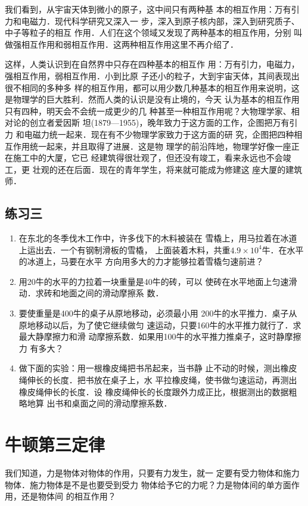     我们看到，从宇宙天体到微小的原子，这中间只有两种基
本的相互作用：万有引力和电磁力．现代科学研究又深入一
步，深入到原子核内部，深入到研究质子、中子等粒子的相互
作用．人们在这个领域又发现了两种基本的相互作用，分别
叫做强相互作用和弱相互作用．这两种相互作用这里不再介绍了．

    这样，人类认识到在自然界中只存在四种基本的相互作
用：万有引力，电磁力，强相互作用，弱相互作用．小到比原
子还小的粒子，大到宇宙天体，其间表现出很不相同的多种多
样的相互作用，都可以用少数几种基本的相互作用来说明，这
是物理学的巨大胜利．然而人类的认识是没有止境的，今天
认为基本的相互作用只有四种，明天会不会统一成更少的几
种甚至一种相互作用呢？大物理学家、相对论的创立者爱因斯
坦(1879—1955)，晚年致力于这方面的工作，企图把万有引力
和电磁力统一起来．现在有不少物理学家致力于这方面的研
究，企图把四种相互作用统一起来，并且取得了进展．这是物
理学的前沿阵地，物理学好像一座正在施工中的大厦，它已
经建筑得很壮观了，但还没有竣工，看来永远也不会竣工，更
壮观的还在后面．现在的青年学生，将来就可能成为修建这
座大厦的建筑师．

\subsection*{练习三} 
\begin{enumerate} 
\item  在东北的冬季伐木工作中，许多伐下的木料被装在
雪橇上，用马拉着在冰道上运出去．一个有钢制滑板的雪橇，
上面装着木料，共重$4.9\times 10^4$牛．在水平的冰道上，马要在水平
方向用多大的力才能够拉着雪橇匀速前进？

\item  用20牛的水平的力拉着一块重量是40牛的砖，可以
使砖在水平地面上匀速滑动．求砖和地面之间的滑动摩擦系
数．
\item  要使重量是400牛的桌子从原地移动，必须最小用
200牛的水平推力．桌子从原地移动以后，为了使它继续做匀
速运动，只要160牛的水平推力就行了．求最大静摩擦力和滑
动摩擦系数．如果用100牛的水平推力推桌子，这时静摩擦力
有多大？

\item  做下面的实验：用一根橡皮绳把书吊起来，当书静
止不动的时候，测出橡皮绳伸长的长度．把书放在桌子上，水
平拉橡皮绳，使书做匀速运动，再测出橡皮绳伸长的长度．设
橡皮绳伸长的长度跟外力成正比，根据测出的数据粗略地算
出书和桌面之间的滑动摩擦系数．
\end{enumerate} 


\section{牛顿第三定律} 
我们知道，力是物体对物体的作用，只要有力发生，就一
定要有受力物体和施力物体．施力物体是不是也要受到受力
物体给予它的力呢？力是物体间的单方面作用，还是物体间
的相互作用？

